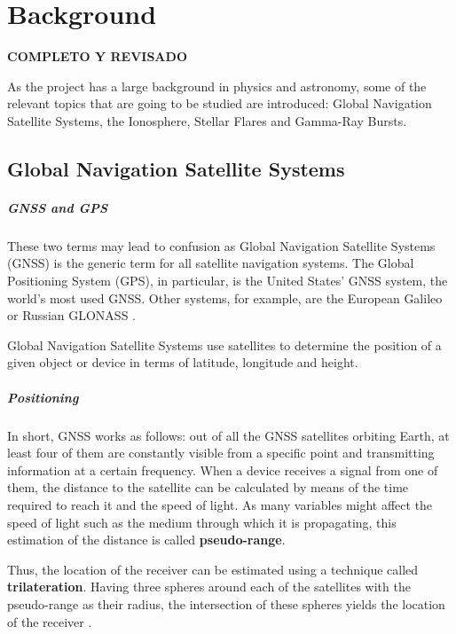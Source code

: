 \chapter{Background}

\textbf{COMPLETO Y REVISADO}

As the project has a large background in physics and astronomy, some of the relevant topics that are going to be studied are introduced: Global Navigation Satellite Systems, the Ionosphere, Stellar Flares and Gamma-Ray Bursts.

\section{Global Navigation Satellite Systems}

\paragraph{GNSS and GPS}

These two terms may lead to confusion as Global Navigation Satellite Systems (GNSS) is the generic term for all satellite navigation systems. The Global Positioning System (GPS), in particular, is the United States' GNSS system, the world's most used GNSS. Other systems, for example, are the European Galileo or Russian GLONASS \cite{hegarty2008evolution}.

Global Navigation Satellite Systems use satellites to determine the position of a given object or device in terms of latitude, longitude and height. 

\paragraph{Positioning}

In short, GNSS works as follows: out of all the GNSS satellites orbiting Earth, at least four of them are constantly visible from a specific point and transmitting information at a certain frequency. When a device receives a signal from one of them, the distance to the satellite can be calculated by means of the time required to reach it and the speed of light. As many variables might affect the speed of light such as the medium through which it is propagating, this estimation of the distance is called \textbf{pseudo-range}. 

Thus, the location of the receiver can be estimated using a technique called \textbf{trilateration}. Having three spheres around each of the satellites with the pseudo-range as their radius, the intersection of these spheres yields the location of the receiver \cite{hofmann2007gnss}. 

